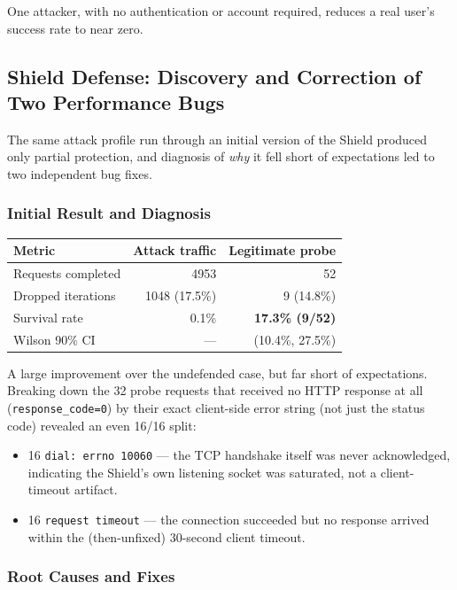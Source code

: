 \documentclass[11pt]{article}
\begin{document}
One attacker, with no authentication or account required, reduces a real
user's success rate to near zero.

\subsection{Shield Defense: Discovery and Correction of Two Performance Bugs}
\label{sec:reorder}

The same attack profile run through an initial version of the Shield produced
only partial protection, and diagnosis of \emph{why} it fell short of
expectations led to two independent bug fixes.

\subsubsection{Initial Result and Diagnosis}

\begin{center}
\begin{tabular}{lrr}
\toprule
Metric & Attack traffic & Legitimate probe \\
\midrule
Requests completed & 4953 & 52 \\
Dropped iterations & 1048 (17.5\%) & 9 (14.8\%) \\
Survival rate & 0.1\% & \textbf{17.3\% (9/52)} \\
Wilson 90\% CI & --- & (10.4\%, 27.5\%) \\
\bottomrule
\end{tabular}
\end{center}

A large improvement over the undefended case, but far short of expectations.
Breaking down the 32 probe requests that received no HTTP response at all
(\texttt{response\_code=0}) by their exact client-side error string (not just
the status code) revealed an even 16/16 split:

\begin{itemize}
    \item 16 \texttt{dial: errno 10060} --- the TCP handshake itself was never
    acknowledged, indicating the Shield's own listening socket was saturated,
    not a client-timeout artifact.
    \item 16 \texttt{request timeout} --- the connection succeeded but no
    response arrived within the (then-unfixed) 30-second client timeout.
\end{itemize}

\subsubsection{Root Causes and Fixes}
\end{document}

